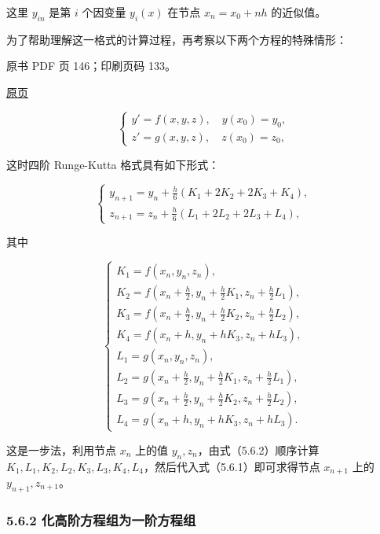 这里 \(y_{in}\) 是第 \(i\) 个因变量 \(y_i(x)\) 在节点 \(x_n=x_0+nh\) 的近似值。

为了帮助理解这一格式的计算过程，再考察以下两个方程的特殊情形：

\clearpage

原书 PDF 页 146；印刷页码 133。

\href{source-images/pdf-146.jpeg}{原页}

\[
\begin{cases}
y'=f(x,y,z),\quad y(x_0)=y_0,\\
z'=g(x,y,z),\quad z(x_0)=z_0,
\end{cases}
\]

这时四阶 Runge-Kutta 格式具有如下形式：

\[
\begin{cases}
\displaystyle y_{n+1}=y_n+\frac h6(K_1+2K_2+2K_3+K_4),\\[6pt]
\displaystyle z_{n+1}=z_n+\frac h6(L_1+2L_2+2L_3+L_4),
\end{cases}
\tag{5.6.1}
\]

其中

\[
\begin{cases}
K_1=f(x_n,y_n,z_n),\\
\displaystyle K_2=f\left(x_n+\frac h2,y_n+\frac h2K_1,z_n+\frac h2L_1\right),\\[4pt]
\displaystyle K_3=f\left(x_n+\frac h2,y_n+\frac h2K_2,z_n+\frac h2L_2\right),\\[4pt]
K_4=f(x_n+h,y_n+hK_3,z_n+hL_3),\\
L_1=g(x_n,y_n,z_n),\\
\displaystyle L_2=g\left(x_n+\frac h2,y_n+\frac h2K_1,z_n+\frac h2L_1\right),\\[4pt]
\displaystyle L_3=g\left(x_n+\frac h2,y_n+\frac h2K_2,z_n+\frac h2L_2\right),\\[4pt]
L_4=g(x_n+h,y_n+hK_3,z_n+hL_3).
\end{cases}
\tag{5.6.2}
\]

这是一步法，利用节点 \(x_n\) 上的值 \(y_n,z_n\)，由式（5.6.2）顺序计算 \(K_1,\allowbreak L_1,\allowbreak K_2,\allowbreak L_2,\allowbreak K_3,\allowbreak L_3,\allowbreak K_4,\allowbreak L_4\)，然后代入式（5.6.1）即可求得节点 \(x_{n+1}\) 上的 \(y_{n+1},z_{n+1}\)。

\subsubsection{5.6.2 化高阶方程组为一阶方程组}\label{ch05b-ux5316ux9ad8ux9636ux65b9ux7a0bux7ec4ux4e3aux4e00ux9636ux65b9ux7a0bux7ec4}

